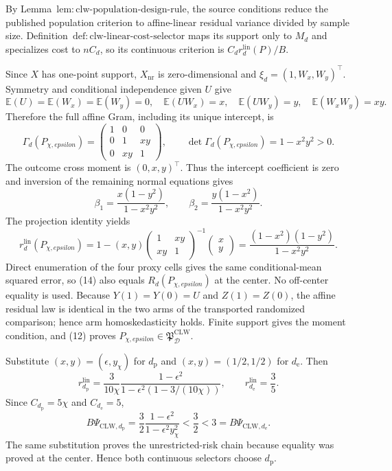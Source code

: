 By Lemma~\(\mathrm{lem{:}clw\text{-}population\text{-}design\text{-}rule}\), the source conditions reduce the published population criterion to affine-linear residual variance divided by sample size. Definition~\(\mathrm{def{:}clw\text{-}linear\text{-}cost\text{-}selector}\) maps its support only to \(M_d\) and specializes cost to \(nC_d\), so its continuous criterion is \(C_dr_d^{\mathrm{lin}}(P)/B\).

Since \(X\) has one-point support, \(X_{\mathrm{nr}}\) is zero-dimensional and \(\xi_d=(1,W_x,W_y)^\top\). Symmetry and conditional independence given \(U\) give
\[
 \mathbb E(U)=\mathbb E(W_x)=\mathbb E(W_y)=0,
 \quad \mathbb E(UW_x)=x,
 \quad \mathbb E(UW_y)=y,
 \quad \mathbb E(W_xW_y)=xy.                              \tag{11}
\]
Therefore the full affine Gram, including its unique intercept, is
\[
 \Gamma_d(P_{\chi,epsilon})
 =\begin{pmatrix}1&0&0\\0&1&xy\\0&xy&1\end{pmatrix},
 \qquad \det\Gamma_d(P_{\chi,epsilon})=1-x^2y^2>0.       \tag{12}
\]
The outcome cross moment is \((0,x,y)^\top\). Thus the intercept coefficient is zero and inversion of the remaining normal equations gives
\[
 \beta_1=\frac{x(1-y^2)}{1-x^2y^2},
 \qquad
 \beta_2=\frac{y(1-x^2)}{1-x^2y^2}.                        \tag{13}
\]
The projection identity yields
\[
 r_d^{\mathrm{lin}}(P_{\chi,epsilon})
 =1-(x,y)
 \begin{pmatrix}1&xy\\xy&1\end{pmatrix}^{-1}
 \begin{pmatrix}x\\y\end{pmatrix}
 =\frac{(1-x^2)(1-y^2)}{1-x^2y^2}.                         \tag{14}
\]
Direct enumeration of the four proxy cells gives the same conditional-mean squared error, so (14) also equals \(R_d(P_{\chi,epsilon})\) at the center. No off-center equality is used. Because \(Y(1)=Y(0)=U\) and \(Z(1)=Z(0)\), the affine residual law is identical in the two arms of the transported randomized comparison; hence arm homoskedasticity holds. Finite support gives the moment condition, and (12) proves \(P_{\chi,epsilon}\in\mathfrak P_{\mathcal D}^{\mathrm{CLW}}\).

Substitute \((x,y)=(\epsilon,y_\chi)\) for \(d_{\mathrm p}\) and \((x,y)=(1/2,1/2)\) for \(d_{\mathrm e}\). Then
\[
 r_{d_{\mathrm p}}^{\mathrm{lin}}
 =\frac{3}{10\chi}
 \frac{1-\epsilon^2}{1-\epsilon^2(1-3/(10\chi))},
 \qquad r_{d_{\mathrm e}}^{\mathrm{lin}}=\frac35.         \tag{15}
\]
Since \(C_{d_{\mathrm p}}=5\chi\) and \(C_{d_{\mathrm e}}=5\),
\[
 B\Psi_{\mathrm{CLW},d_{\mathrm p}}
 =\frac32\frac{1-\epsilon^2}{1-\epsilon^2y_\chi^2}
 <\frac32<3=B\Psi_{\mathrm{CLW},d_{\mathrm e}}.           \tag{16}
\]
The same substitution proves the unrestricted-risk chain because equality was proved at the center. Hence both continuous selectors choose \(d_{\mathrm p}\).

